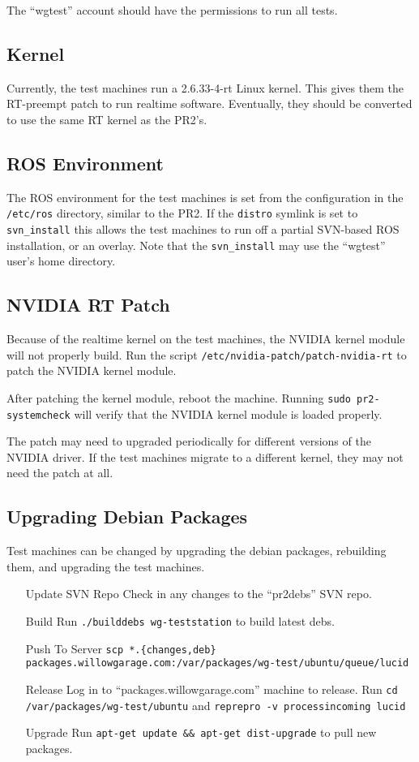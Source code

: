 \documentclass[11pt]{report}
\begin{document}
The ``wgtest'' account should have the permissions to run all tests.

\subsection{Kernel}

Currently, the test machines run a 2.6.33-4-rt Linux kernel. This gives them the RT-preempt patch to run realtime software. Eventually, they should be converted to use the same RT kernel as the PR2's.

\subsection{ROS Environment}

The ROS environment for the test machines is set from the configuration in the \texttt{/etc/ros} directory, similar to the PR2. If the \texttt{distro} symlink is set to \texttt{svn\_install} this allows the test machines to run off a partial SVN-based ROS installation, or an overlay. Note that the \texttt{svn\_install} may use the ``wgtest'' user's home directory.

\subsection{NVIDIA RT Patch}

Because of the realtime kernel on the test machines, the NVIDIA kernel module will not properly build. Run the script \texttt{/etc/nvidia-patch/patch-nvidia-rt} to patch the NVIDIA kernel module.

After patching the kernel module, reboot the machine. Running \texttt{sudo pr2-systemcheck} will verify that the NVIDIA kernel module is loaded properly.

The patch may need to upgraded periodically for different versions of the NVIDIA driver. If the test machines migrate to a different kernel, they may not need the patch at all.

\subsection{Upgrading Debian Packages}

Test machines can be changed by upgrading the debian packages, rebuilding them, and upgrading the test machines.

\begin{itemize}
\item [Update SVN Repo] Check in any changes to the ``pr2debs'' SVN repo.
\item [Build] Run \texttt{./builddebs wg-teststation} to build latest debs.
\item [Push To Server] \texttt{scp *.\{changes,deb\} packages.willowgarage.com:/var/packages/wg-test/ubuntu/queue/lucid}
\item [Release] Log in to ``packages.willowgarage.com'' machine to release. Run \texttt{cd /var/packages/wg-test/ubuntu} and \texttt{reprepro -v processincoming lucid}
\item [Upgrade] Run \texttt{apt-get update \&\& apt-get dist-upgrade} to pull new packages.
\end{itemize}
\end{document}
